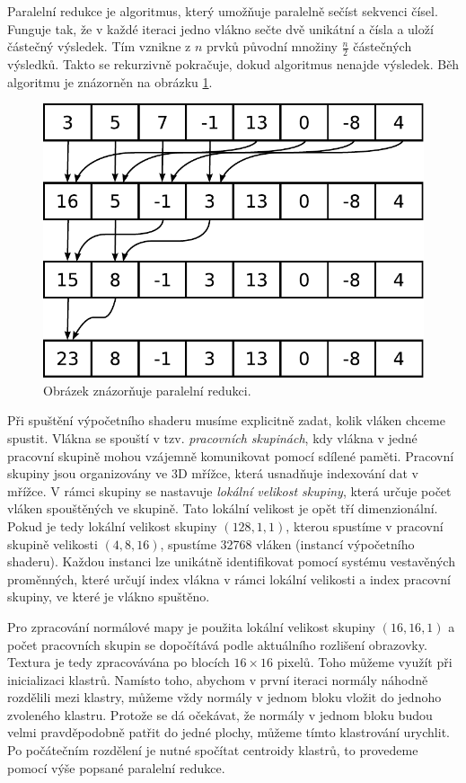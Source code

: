 \documentclass[11pt,twoside,a4paper]{book}
\begin{document}
Paralelní redukce je algoritmus, který umožňuje paralelně sečíst sekvenci čísel. Funguje tak, že v každé iteraci jedno vlákno sečte dvě unikátní a čísla a uloží částečný výsledek. Tím vznikne z $n$ prvků původní množiny $\frac{n}{2}$ částečných výsledků. Takto se rekurzivně pokračuje, dokud algoritmus nenajde výsledek. Běh algoritmu je znázorněn na obrázku \ref{fig:reduction}.

\begin{figure}[h]
\begin{center}
\includegraphics[width=\textwidth*2/3]{figures/reduction}
\caption{Obrázek znázorňuje paralelní redukci.}
\label{fig:reduction}
\end{center}
\end{figure}

Při spuštění výpočetního shaderu musíme explicitně zadat, kolik vláken chceme spustit. Vlákna se spouští v tzv. \emph{pracovních skupinách}, kdy vlákna v jedné pracovní skupině mohou vzájemně komunikovat pomocí sdílené paměti.  Pracovní skupiny jsou organizovány ve 3D mřížce, která usnadňuje indexování dat v mřížce. V rámci skupiny se nastavuje \emph{lokální velikost skupiny}, která určuje počet vláken spouštěných ve skupině. Tato lokální velikost je opět tří dimenzionální.  Pokud je tedy lokální velikost skupiny $(128, 1, 1)$, kterou spustíme v pracovní skupině velikosti $(4, 8, 16)$, spustíme 32768 vláken (instancí výpočetního shaderu). Každou instanci lze unikátně identifikovat pomocí systému vestavěných proměnných, které určují index vlákna v rámci lokální velikosti a index pracovní skupiny, ve které je vlákno spuštěno.

Pro zpracování normálové mapy je použita lokální velikost skupiny $(16, 16, 1)$ a počet pracovních skupin se dopočítává podle aktuálního rozlišení obrazovky. Textura je tedy zpracovávána po blocích $16\times16$ pixelů. Toho můžeme využít při inicializaci klastrů. Namísto toho, abychom v první iteraci normály náhodně rozdělili mezi klastry, můžeme vždy normály v jednom bloku vložit do jednoho zvoleného klastru. Protože se dá očekávat, že normály v jednom bloku budou velmi pravděpodobně patřit do jedné plochy, můžeme tímto klastrování urychlit. Po počátečním rozdělení je nutné spočítat centroidy klastrů, to provedeme pomocí výše popsané paralelní redukce. 
\end{document}
